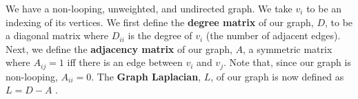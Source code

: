 We have a non-looping, unweighted, and undirected graph. We take $v_i$ to be an indexing of its vertices.
We first define the \textbf{degree matrix} of our graph, $D$, to be a diagonal matrix where $D_{ii}$ is the degree of $v_i$ (the number of adjacent edges).
Next, we define the \textbf{adjacency matrix} of our graph, $A$, a symmetric matrix where $A_{ij}=1$ iff there is an edge between $v_i$ and $v_j$. Note that, since our graph is non-looping, $A_{ii}=0$.
The \textbf{Graph Laplacian}, $L$, of our graph is now defined as $L=D-A$ \cite{weisstein}.